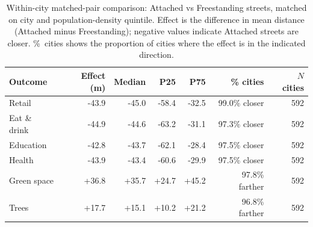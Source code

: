 \begin{table}[ht]
  \centering
  \caption{Within-city matched-pair comparison: Attached vs Freestanding streets,
    matched on city and population-density quintile. Effect is the difference
    in mean distance (Attached minus Freestanding); negative values indicate
    Attached streets are closer. \%~cities shows the proportion of cities
    where the effect is in the indicated direction.}
  \label{tab:matched}
  \small
  \begin{tabular}{lrrrrrr}
    \toprule
    Outcome & Effect (m) & Median & P25 & P75 & \% cities & $N$ cities \\
    \midrule
    Retail & -43.9 & -45.0 & -58.4 & -32.5 & 99.0\% closer & 592 \\
    Eat \& drink & -44.9 & -44.6 & -63.2 & -31.1 & 97.3\% closer & 592 \\
    Education & -42.8 & -43.7 & -62.1 & -28.4 & 97.5\% closer & 592 \\
    Health & -43.9 & -43.4 & -60.6 & -29.9 & 97.5\% closer & 592 \\
    Green space & +36.8 & +35.7 & +24.7 & +45.2 & 97.8\% farther & 592 \\
    Trees & +17.7 & +15.1 & +10.2 & +21.2 & 96.8\% farther & 592 \\
    \bottomrule
  \end{tabular}
\end{table}
